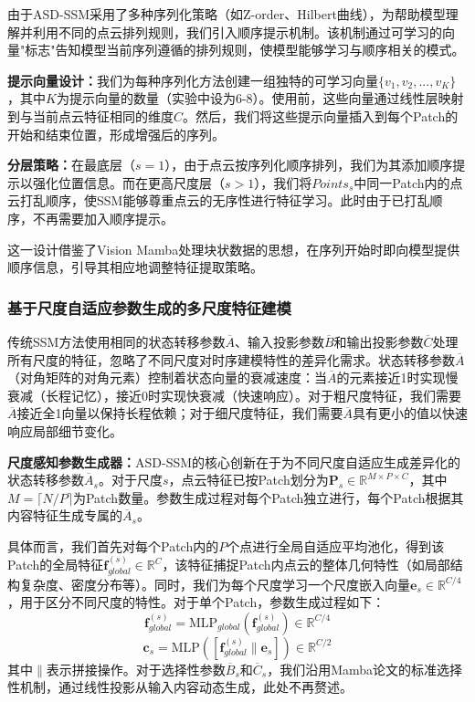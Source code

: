 \documentclass[preprint,12pt]{elsarticle}
\begin{document}
由于ASD-SSM采用了多种序列化策略（如Z-order、Hilbert曲线），为帮助模型理解并利用不同的点云排列规则，我们引入顺序提示机制。该机制通过可学习的向量"标志"告知模型当前序列遵循的排列规则，使模型能够学习与顺序相关的模式。

\textbf{提示向量设计：}我们为每种序列化方法创建一组独特的可学习向量$\{v_1, v_2, ..., v_K\}$，其中$K$为提示向量的数量（实验中设为6-8）。使用前，这些向量通过线性层映射到与当前点云特征相同的维度$C$。然后，我们将这些提示向量插入到每个Patch的开始和结束位置，形成增强后的序列。

\textbf{分层策略：}在最底层（$s=1$），由于点云按序列化顺序排列，我们为其添加顺序提示以强化位置信息。而在更高尺度层（$s>1$），我们将$Points_s$中同一Patch内的点云打乱顺序，使SSM能够尊重点云的无序性进行特征学习。此时由于已打乱顺序，不再需要加入顺序提示。

这一设计借鉴了Vision Mamba\cite{VisionMamba}处理块状数据的思想，在序列开始时即向模型提供顺序信息，引导其相应地调整特征提取策略。


\subsubsection{基于尺度自适应参数生成的多尺度特征建模}

传统SSM方法使用相同的状态转移参数$\overline{A}$、输入投影参数$\overline{B}$和输出投影参数$\overline{C}$处理所有尺度的特征，忽略了不同尺度对时序建模特性的差异化需求。状态转移参数$\overline{A}$（对角矩阵的对角元素）控制着状态向量的衰减速度：当$\overline{A}$的元素接近1时实现慢衰减（长程记忆），接近0时实现快衰减（快速响应）。对于粗尺度特征，我们需要$\overline{A}$接近全1向量以保持长程依赖；对于细尺度特征，我们需要$\overline{A}$具有更小的值以快速响应局部细节变化。

\textbf{尺度感知参数生成器：}ASD-SSM的核心创新在于为不同尺度自适应生成差异化的状态转移参数$\overline{A}_s$。对于尺度$s$，点云特征已按Patch划分为$\mathbf{P}_s \in \mathbb{R}^{M \times P \times C}$，其中$M = \lceil N/P \rceil$为Patch数量。参数生成过程对每个Patch独立进行，每个Patch根据其内容特征生成专属的$\overline{A}_s$。

具体而言，我们首先对每个Patch内的$P$个点进行全局自适应平均池化，得到该Patch的全局特征$\mathbf{f}_{global}^{(s)} \in \mathbb{R}^{C}$，该特征捕捉Patch内点云的整体几何特性（如局部结构复杂度、密度分布等）。同时，我们为每个尺度学习一个尺度嵌入向量$\mathbf{e}_s \in \mathbb{R}^{C/4}$，用于区分不同尺度的特性。对于单个Patch，参数生成过程如下：
\begin{equation}
	\mathbf{f}_{global}^{(s)} = \text{MLP}_{global}(\mathbf{f}_{global}^{(s)}) \in \mathbb{R}^{C/4}
\end{equation}
\begin{equation}
	\mathbf{c}_s = \text{MLP}([\mathbf{f}_{global}^{(s)} \| \mathbf{e}_s]) \in \mathbb{R}^{C/2}
\end{equation}
其中$\|$表示拼接操作。对于选择性参数$\overline{B}_s$和$\overline{C}_s$，我们沿用Mamba论文\cite{Mamba}的标准选择性机制，通过线性投影从输入内容动态生成，此处不再赘述。
\end{document}

